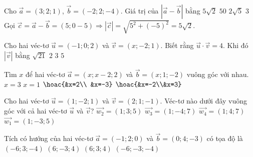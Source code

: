 \begin{ex}
	Cho $\vec{a}=(3;2;1)$, $\vec{b}=(-2;2;-4)$. Giá trị của $\left| \vec{a}-\vec{b} \right|$ bằng
	\choice
	{\True$5\sqrt{2}$}
	{$50$}
	{$2\sqrt{5}$}
	{$3$}
	\loigiai
	{
		Gọi $\vec{c}=\vec{a}-\vec{b}=(5;0-5)\Rightarrow \left| \vec{c} \right|=\sqrt{5^2+(-5)^2}=5\sqrt{2}$.}
\end{ex} 

\begin{ex}
	Cho hai véc-tơ $\vec{u}=(-1;0;2)$ và $\vec{v}=(x;-2;1)$. Biết rằng $\vec{u}\cdot \vec{v}=4$. Khi đó $|\vec{v}|$ bằng
	\choice
	{$\sqrt{21}$}
	{$2$}
	{\True $3$}
	{$5$}
\end{ex} 

\begin{ex}
	Tìm $x$ để hai véc-tơ $\vec{a}=(x;x-2;2)$ và $\vec{b}=(x;1;-2)$ vuông góc với nhau.
	\choice
	{$x=3$}
	{$x=1$}
	{\True $\hoac{&x=2\\ &x=-3}$}
	{$\hoac{&x=-2\\&x=3}$}
\end{ex} 

\begin{ex}
	Cho hai véc-tơ $\vec{u}=(1;-2;1)$ và $\vec{v}=(2;1;-1)$. Véc-tơ nào dưới đây vuông góc với cả hai véc-tơ $\vec{u}$ và $\vec{v}$?
	\choice
	{\True $\vec{w_2}=(1;3;5)$}
	{$\vec{w_3}=(1;-4;7)$}
	{$\vec{w_4}=(1;4;7)$}
	{$\vec{w_1}=(1;-3;5)$}
\end{ex} 

\begin{ex}
	Tích có hướng của hai véc-tơ $\vec{a}=(-1;2;0)$ và $\vec{b}=(0;4;-3)$ có tọa độ là
	\choice
	{$(-6;3;-4)$}
	{$(6;-3;4)$}
	{$(6;3;4)$}
	{\True $(-6;-3;-4)$}
\end{ex} 

